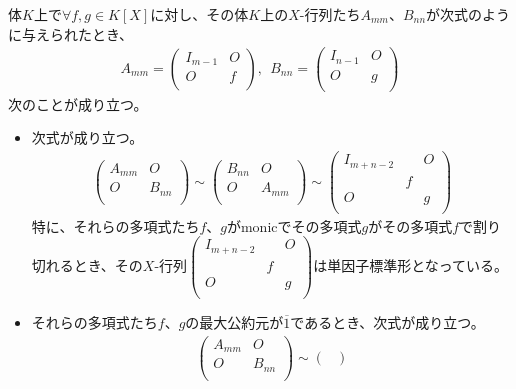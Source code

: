 \documentclass[dvipdfmx]{jsarticle}
\begin{document}
\begin{thm}\label{2.2.8.14}
体$K$上で$\forall f,g \in K[ X]$に対し、その体$K$上の$X$-行列たち$A_{mm}$、$B_{nn}$が次式のように与えられたとき、
\begin{align*}
A_{mm} = \begin{pmatrix}
I_{m - 1} & O \\
O & f \\
\end{pmatrix},\ \ B_{nn} = \begin{pmatrix}
I_{n - 1} & O \\
O & g \\
\end{pmatrix}
\end{align*}
次のことが成り立つ。
\begin{itemize}
\item
  次式が成り立つ。
\begin{align*}
\begin{pmatrix}
A_{mm} & O \\
O & B_{nn} \\
\end{pmatrix} \sim \begin{pmatrix}
B_{nn} & O \\
O & A_{mm} \\
\end{pmatrix} \sim \begin{pmatrix}
I_{m + n - 2} & \  & O \\
\  & f & \  \\
O & \  & g \\
\end{pmatrix}
\end{align*}
  特に、それらの多項式たち$f$、$g$がmonicでその多項式$g$がその多項式$f$で割り切れるとき、その$X$-行列$\begin{pmatrix}
I_{m + n - 2} & \  & O \\
\  & f & \  \\
O & \  & g \\
\end{pmatrix}$は単因子標準形となっている。
\item
  それらの多項式たち$f$、$g$の最大公約元が$\overline{1}$であるとき、次式が成り立つ。
\begin{align*}
\begin{pmatrix}
A_{mm} & O \\
O & B_{nn} \\
\end{pmatrix} \sim \begin{pmatrix}

\end{pmatrix}
\end{align*}
\end{itemize}
\end{thm}
\end{document}
